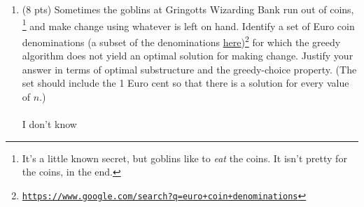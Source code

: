 \documentclass[12pt]{article}
\begin{document}
\begin{enumerate}
\begin{enumerate}
	\item \label{3b} (8 pts) Sometimes the goblins at Gringotts Wizarding Bank run out of coins,%
	\footnote{It's a little known secret, but goblins like to \textit{eat} the coins. It isn't pretty for the coins, in the end.}
	and make change using whatever is left on hand. Identify a set of Euro coin denominations (a subset of the denominations {\color{blue} \href{https://www.google.com/search?q=euro+coin+denominations}{\underline{here}}})\footnote{\href{https://www.google.com/search?q=euro+coin+denominations}{\tt https://www.google.com/search?q=euro+coin+denominations}} for which the greedy algorithm does not yield an optimal solution for making change. Justify your answer in terms of optimal substructure and the greedy-choice property. (The set should include the 1 Euro cent so that there is a solution for every value of $n$.) \\ \\
	
	I don't know
	
	
	\end{enumerate}

	
	

\end{enumerate}
\end{document}

